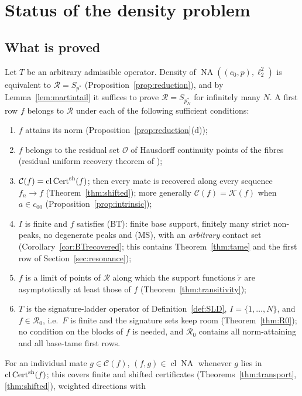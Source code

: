 \documentclass[10pt]{amsart}
\theoremstyle{definition}
\theoremstyle{remark}
\newcommand{\NA}{\operatorname{NA}}
\newcommand{\Cset}{\mathcal C}
\newcommand{\Cert}{\operatorname{Cert}}
\newcommand{\cl}{\operatorname{cl}}
\newcommand{\Rec}{\mathcal R}
\begin{document}
\section{Status of the density problem}\label{sec:status}

\subsection{What is proved}
Let $T$ be an arbitrary admissible operator.  Density of
$\NA((c_0,p),\ell_2^2)$ is equivalent to $\Rec=S_{p^*}$
(Proposition~\ref{prop:reduction}), and by Lemma~\ref{lem:martintail} it
suffices to prove $\Rec=S_{p_N^*}$ for infinitely many $N$.  A first row
$f$ belongs to $\Rec$ under each of the following sufficient conditions:
\begin{enumerate}
\item[(S1)] $f$ attains its norm (Proposition~\ref{prop:reduction}(d));
\item[(S2)] $f$ belongs to the residual set $\mathcal O$ of Hausdorff continuity
points of the fibres (residual uniform recovery theorem of \cite{PrA});
\item[(S3)] $\Cset(f)=\cl\Cert^{\rm sh}(f)$; then every mate is recovered
along every sequence $f_n\to f$ (Theorem~\ref{thm:shifted}); more generally
$\Cset(f)=\mathcal K(f)$ when $a\in c_{00}$ (Proposition~\ref{prop:intrinsic});
\item[(S4)] $I$ is finite and $f$ satisfies \textup{(BT)}: finite base support,
finitely many strict non-peaks, no degenerate peaks and \textup{(MS)}, with
an \emph{arbitrary} contact set (Corollary~\ref{cor:BTrecovered}; this
contains Theorem~\ref{thm:tame} and the first row of
Section~\ref{sec:resonance});
\item[(S5)] $f$ is a limit of points of $\Rec$ along which the support
functions $\tilde r$ are asymptotically at least those of $f$
(Theorem~\ref{thm:transitivity});
\item[(S6)] $T$ is the signature-ladder operator of
Definition~\ref{def:SLD}, $I=\{1,\dots,N\}$, and $f\in\mathcal R_0$, i.e.\
$F$ is finite and the signature sets keep room (Theorem~\ref{thm:R0}); no
condition on the blocks of $f$ is needed, and $\mathcal R_0$ contains all
norm-attaining and all base-tame first rows.
\end{enumerate}
For an individual mate $g\in\Cset(f)$, $(f,g)\in\cl\NA$ whenever $g$ lies
in $\cl\Cert^{\rm sh}(f)$; this covers finite and shifted certificates
(Theorems~\ref{thm:transport}, \ref{thm:shifted}), weighted directions with
\end{document}
